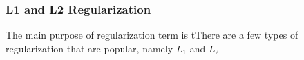 \subsubsection{L1 and L2 Regularization}

The main purpose of regularization term is tThere are a few types of regularization that are popular, namely $L_1$ and $L_2$